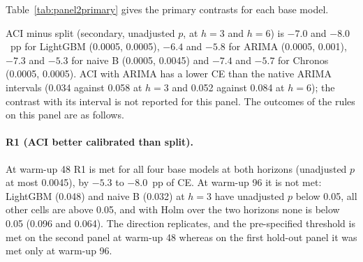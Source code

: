 \begin{table}[t]
\centering
\caption{Calibration error by interval method, horizon and base model, second hold-out panel (10 countries, warm-up 48).}
\label{tab:ce_ho2}
\small
\fittable{}
\end{table}

Table~\ref{tab:panel2primary} gives the primary contrasts for each base model.

\begin{table}[t]
\centering
\caption{Primary contrasts, second hold-out panel, warm-up 48: $T$ in pp of CE, 95\% bootstrap interval, and Holm $p$ over the four primary tests of the base model.}
\label{tab:panel2primary}
\small
{}
\end{table}

ACI minus split (secondary, unadjusted $p$, at $h=3$ and $h=6$) is $-7.0$ and $-8.0$~pp for LightGBM (0.0005, 0.0005), $-6.4$ and $-5.8$ for ARIMA (0.0005, 0.001), $-7.3$ and $-5.3$ for naive B (0.0005, 0.0045) and $-7.4$ and $-5.7$ for Chronos (0.0005, 0.0005). ACI with ARIMA has a lower CE than the native ARIMA intervals (0.034 against 0.058 at $h=3$ and 0.052 against 0.084 at $h=6$); the contrast with its interval is not reported for this panel. The outcomes of the rules on this panel are as follows.

\paragraph{R1 (ACI better calibrated than split).} At warm-up 48 R1 is met for all four base models at both horizons (unadjusted $p$ at most 0.0045), by $-5.3$ to $-8.0$~pp of CE. At warm-up 96 it is not met: LightGBM (0.048) and naive B (0.032) at $h=3$ have unadjusted $p$ below 0.05, all other cells are above 0.05, and with Holm over the two horizons none is below 0.05 (0.096 and 0.064). The direction replicates, and the pre-specified threshold is met on the second panel at warm-up 48 whereas on the first hold-out panel it was met only at warm-up 96.

